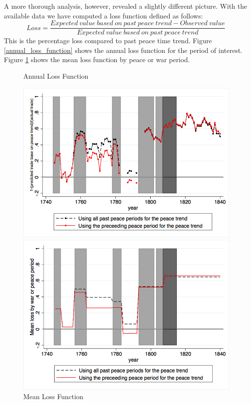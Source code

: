 \documentclass[12pt,a4paper,notitlepage]{article}
\begin{document}
A more thorough analysis, however, revealed a slightly different picture.
With the available data we have computed a loss function defined as follows: 
\begin{equation*}
Loss = \frac{Expected \> value \> based \> on \>past \> peace \>trend - Observed \> value}{Expected \> value \> based \> on \>past \> peace \>trend}
\end{equation*}
This is the percentage loss compared to past peace time trend. Figure \ref{annual_loss_function} shows the annual loss function for the period of interest. Figure \ref{mean_loss_function} shows the mean loss function by peace or war period.
\begin{center}
\begin{figure}[H]
\caption{Annual Loss Function}
\label{annual_loss_function}
\centering
\includegraphics[scale=.425]{Annual_loss_function.png}
\caption{Mean Loss Function}
\label{mean_loss_function}
\includegraphics[scale=.4]{Mean_loss_function.png}
\end{figure}
\end{center}
\end{document}
